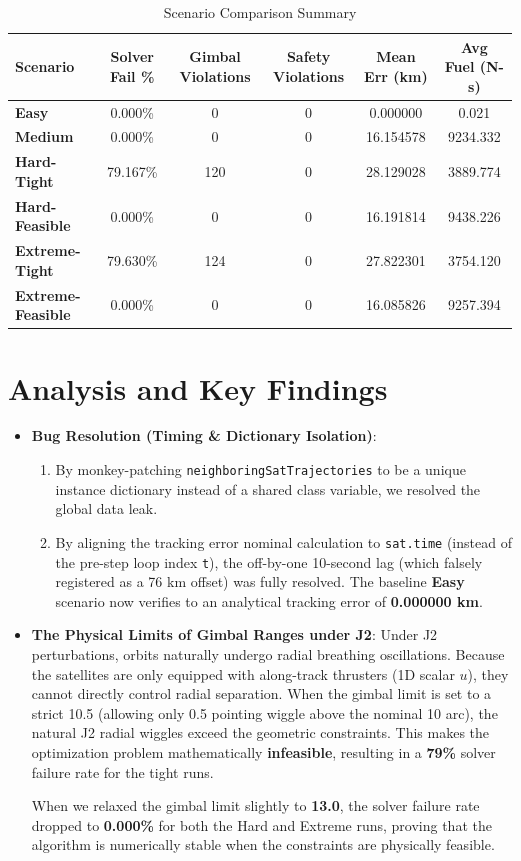 \documentclass{article}
\begin{document}
\begin{table}[htbp]
\centering
\caption{Scenario Comparison Summary}
\label{tab:summary}
\begin{tabular}{lccccc}
\toprule
\textbf{Scenario} & \textbf{Solver Fail \%} & \textbf{Gimbal Violations} & \textbf{Safety Violations} & \textbf{Mean Err (km)} & \textbf{Avg Fuel (N-s)} \\
\midrule
\textbf{Easy} & 0.000\% & 0 & 0 & 0.000000 & 0.021 \\
\textbf{Medium} & 0.000\% & 0 & 0 & 16.154578 & 9234.332 \\
\textbf{Hard-Tight} & 79.167\% & 120 & 0 & 28.129028 & 3889.774 \\
\textbf{Hard-Feasible} & 0.000\% & 0 & 0 & 16.191814 & 9438.226 \\
\textbf{Extreme-Tight} & 79.630\% & 124 & 0 & 27.822301 & 3754.120 \\
\textbf{Extreme-Feasible} & 0.000\% & 0 & 0 & 16.085826 & 9257.394 \\
\bottomrule
\end{tabular}
\end{table}

\section{Analysis and Key Findings}
\begin{itemize}
    \item \textbf{Bug Resolution (Timing \& Dictionary Isolation)}: 
    \begin{enumerate}
        \item By monkey-patching \texttt{neighboringSatTrajectories} to be a unique instance dictionary instead of a shared class variable, we resolved the global data leak.
        \item By aligning the tracking error nominal calculation to \texttt{sat.time} (instead of the pre-step loop index \texttt{t}), the off-by-one 10-second lag (which falsely registered as a 76 km offset) was fully resolved. The baseline \textbf{Easy} scenario now verifies to an analytical tracking error of \textbf{0.000000 km}.
    \end{enumerate}
    \item \textbf{The Physical Limits of Gimbal Ranges under J2}: 
    Under J2 perturbations, orbits naturally undergo radial breathing oscillations. Because the satellites are only equipped with along-track thrusters (1D scalar $u$), they cannot directly control radial separation. When the gimbal limit is set to a strict 10.5\textdegree{} (allowing only 0.5\textdegree{} pointing wiggle above the nominal 10\textdegree{} arc), the natural J2 radial wiggles exceed the geometric constraints. This makes the optimization problem mathematically \textbf{infeasible}, resulting in a \textbf{79\%} solver failure rate for the tight runs.
    
    When we relaxed the gimbal limit slightly to \textbf{13.0\textdegree{}}, the solver failure rate dropped to \textbf{0.000\%} for both the Hard and Extreme runs, proving that the algorithm is numerically stable when the constraints are physically feasible.
\end{itemize}
\end{document}
